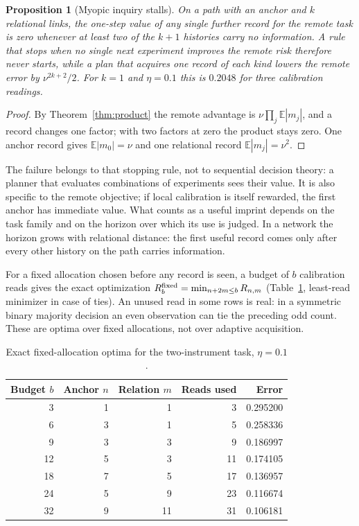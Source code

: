 \documentclass[11pt,a4paper]{article}
\newtheorem{proposition}[definition]{Proposition}
\newcommand{\E}{\mathbb E}
\begin{document}
\begin{proposition}[Myopic inquiry stalls]\label{prop:complement}
On a path with an anchor and $k$ relational links, the one-step value of any single further record for the remote task is zero whenever at least two of the $k+1$ histories carry no information. A rule that stops when no single next experiment improves the remote risk therefore never starts, while a plan that acquires one record of each kind lowers the remote error by $\nu^{2k+2}/2$. For $k=1$ and $\eta=0.1$ this is $0.2048$ for three calibration readings.
\end{proposition}
\begin{proof}
By Theorem~\ref{thm:product} the remote advantage is $\nu\prod_j\E|m_j|$, and a record changes one factor; with two factors at zero the product stays zero. One anchor record gives $\E|m_0|=\nu$ and one relational record $\E|m_j|=\nu^2$.
\end{proof}

The failure belongs to that stopping rule, not to sequential decision theory: a planner that evaluates combinations of experiments sees their value. It is also specific to the remote objective; if local calibration is itself rewarded, the first anchor has immediate value. What counts as a useful imprint depends on the task family and on the horizon over which its use is judged. In a network the horizon grows with relational distance: the first useful record comes only after every other history on the path carries information.

For a fixed allocation chosen before any record is seen, a budget of $b$ calibration reads gives the exact optimization $R^{\rm fixed}_b=\min_{n+2m\le b}R_{n,m}$ (Table~\ref{tab:allocation}, least-read minimizer in case of ties). An unused read in some rows is real: in a symmetric binary majority decision an even observation can tie the preceding odd count. These are optima over fixed allocations, not over adaptive acquisition.

\begin{table}[ht]
\centering
\begin{tabular}{rrrrr}
\toprule
Budget $b$ & Anchor $n$ & Relation $m$ & Reads used & Error\\
\midrule
3 & 1 & 1 & 3 & 0.295200\\
6 & 3 & 1 & 5 & 0.258336\\
9 & 3 & 3 & 9 & 0.186997\\
12 & 5 & 3 & 11 & 0.174105\\
18 & 7 & 5 & 17 & 0.136957\\
24 & 5 & 9 & 23 & 0.116674\\
32 & 9 & 11 & 31 & 0.106181\\
\bottomrule
\end{tabular}
\caption{Exact fixed-allocation optima for the two-instrument task, $\eta=0.1$.}\label{tab:allocation}
\end{table}
\end{document}
